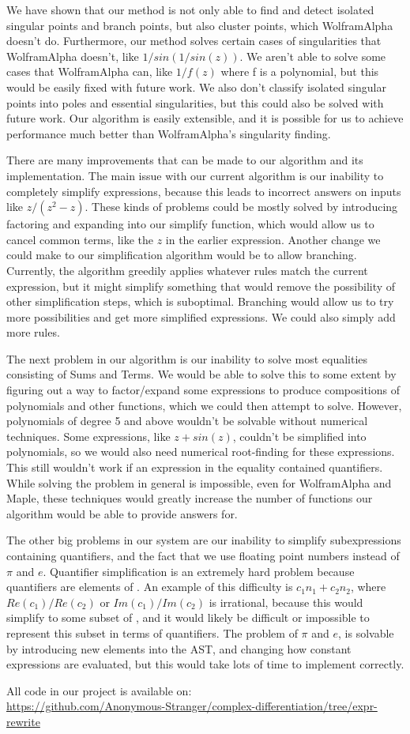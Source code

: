 We have shown that our method is not only able to find and detect isolated singular points and branch points, but also cluster points, which WolframAlpha doesn't do. Furthermore, our method solves certain cases of singularities that WolframAlpha doesn't, like $1/sin(1/sin(z))$. We aren't able to solve some cases that WolframAlpha can, like $1/f(z)$ where f is a polynomial, but this would be easily fixed with future work. We also don't classify isolated singular points into poles and essential singularities, but this could also be solved with future work. Our algorithm is easily extensible, and it is possible for us to achieve performance much better than WolframAlpha's singularity finding.

There are many improvements that can be made to our algorithm and its implementation. The main issue with our current algorithm is our inability to completely simplify expressions, because this leads to incorrect answers on inputs like $z/(z^2-z)$. These kinds of problems could be mostly solved by introducing factoring and expanding into our simplify function, which would allow us to cancel common terms, like the $z$ in the earlier expression. Another change we could make to our simplification algorithm would be to allow branching. Currently, the algorithm greedily applies whatever rules match the current expression, but it might simplify something that would remove the possibility of other simplification steps, which is suboptimal. Branching would allow us to try more possibilities and get more simplified expressions. We could also simply add more rules.

The next problem in our algorithm is our inability to solve most equalities consisting of Sums and Terms. We would be able to solve this to some extent by figuring out a way to factor/expand some expressions to produce compositions of polynomials and other functions, which we could then attempt to solve. However, polynomials of degree 5 and above wouldn't be solvable without numerical techniques. Some expressions, like $z+sin(z)$, couldn't be simplified into polynomials, so we would also need numerical root-finding for these expressions. This still wouldn't work if an expression in the equality contained quantifiers. While solving the problem in general is impossible, even for WolframAlpha and Maple, these techniques would greatly increase the number of functions our algorithm would be able to provide answers for.

The other big problems in our system are our inability to simplify subexpressions containing quantifiers, and the fact that we use floating point numbers instead of $\pi$ and $e$. Quantifier simplification is an extremely hard problem because quantifiers are elements of \ZZ. An example of this difficulty is $c_1n_1+c_2n_2$, where $Re(c_1)/Re(c_2)$ or $Im(c_1)/Im(c_2)$ is irrational, because this would simplify to some subset of \CC, and it would likely be difficult or impossible to represent this subset in terms of quantifiers. The problem of $\pi$ and $e$, is solvable by introducing new elements into the AST, and changing how constant expressions are evaluated, but this would take lots of time to implement correctly.


All code in our project is available on: \\ \href{https://github.com/Anonymous-Stranger/complex-differentiation/tree/expr-rewrite}{https://github.com/Anonymous-Stranger/complex-differentiation/tree/expr-rewrite}
